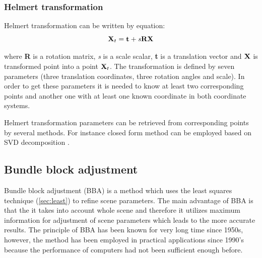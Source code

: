 \documentclass[a4paper,12pt]{article}
\newcommand{\ematr}[1]{%
{\bf #1}%
}
\newcommand{\evect}[1]{%
{\bf #1}%
}
\newcommand{\escal}[1]{%
{\it #1}%
}
\begin{document}
\subsubsection{Helmert transformation}
\label{sec:helmert}

Helmert transformation can be written by equation:
\begin{equation}
\ematr{X}_{t} = \evect{t} + \escal{s}\ematr{R}\evect{X} \\
\end{equation}


where \ematr{R} is a rotation matrix, \escal{s} is a scale scalar, \evect{t} is a translation vector and
 $\evect{X}$ is transformed point into a point $\ematr{X}_{t}$.
The transformation is defined by seven parameters (three translation coordinates, three rotation angles and scale).
In order to get these parameters it is needed to know at least two corresponding points and  another one with 
at least one known coordinate in both coordinate systems. 


Helmert transformation parameters can be retrieved from corresponding points by several methods.  
For instance closed form method can be employed based on SVD decomposition
\cite{sjoberg2013closed}.

\subsection{Bundle block adjustment}

Bundle block adjustment (BBA) is a method which uses the least squares technique (\ref{sec:least}) to refine scene parameters. 
The main advantage of BBA is that the it takes into account whole scene and therefore it utilizes 
maximum information for adjustment of scene parameters which leads to the more accurate results.
The principle of BBA has been known for very long time since 1950s,
however, the method has been employed in practical applications since 1990's because the performance of computers had not been 
sufficient enough before. 
\end{document}
